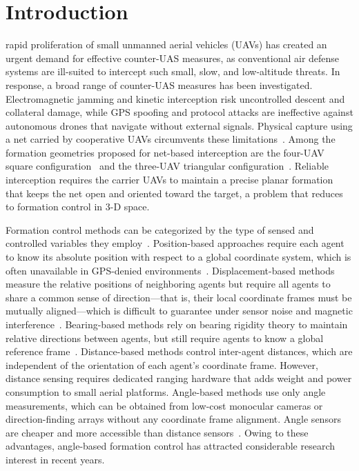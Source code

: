 \documentclass[letterpaper,journal]{IEEEtran}
\theoremstyle{plain}
\theoremstyle{definition}
\theoremstyle{remark}
\begin{document}
\section{Introduction}
 rapid proliferation of small unmanned aerial vehicles (UAVs) has created an urgent demand for effective counter-UAS measures, as conventional air defense systems are ill-suited to intercept such small, slow, and low-altitude threats. In response, a broad range of counter-UAS measures has been investigated. Electromagnetic jamming and kinetic interception risk uncontrolled descent and collateral damage, while GPS spoofing and protocol attacks are ineffective against autonomous drones that navigate without external signals. Physical capture using a net carried by cooperative UAVs circumvents these limitations~\cite{rothe2019concept}. Among the formation geometries proposed for net-based interception are the four-UAV square configuration~\cite{tolman2017counter} and the three-UAV triangular configuration~\cite{chakravarthy2021interception,wang2022discrete}. Reliable interception requires the carrier UAVs to maintain a precise planar formation that keeps the net open and oriented toward the target, a problem that reduces to formation control in 3-D space.

Formation control methods can be categorized by the type of sensed and controlled variables they employ~\cite{oh2015survey}. Position-based approaches require each agent to know its absolute position with respect to a global coordinate system, which is often unavailable in GPS-denied environments~\cite{nguyen2020gps}. Displacement-based methods measure the relative positions of neighboring agents but require all agents to share a common sense of direction---that is, their local coordinate frames must be mutually aligned---which is difficult to guarantee under sensor noise and magnetic interference~\cite{demarina2021displacement}. Bearing-based methods rely on bearing rigidity theory to maintain relative directions between agents, but still require agents to know a global reference frame~\cite{trinh2016bearing}. Distance-based methods control inter-agent distances, which are independent of the orientation of each agent's coordinate frame. However, distance sensing requires dedicated ranging hardware that adds weight and power consumption to small aerial platforms. Angle-based methods use only angle measurements, which can be obtained from low-cost monocular cameras or direction-finding arrays without any coordinate frame alignment. Angle sensors are cheaper and more accessible than distance sensors~\cite{hu2023angle,gong2023review}. Owing to these advantages, angle-based formation control has attracted considerable research interest in recent years.
\end{document}
